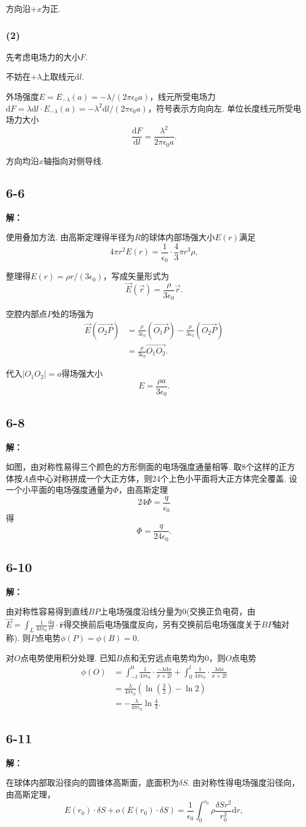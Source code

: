 \documentclass[twocolumn]{ctexart}
\newcommand{\sol}[1]{\subsection*{#1}\noindent\textbf{解：}
	
}
\begin{document}
	方向沿$+x$为正.
	
	\subsubsection*{(2)}
	先考虑电场力的大小$F$.
	
	不妨在$+\lambda$上取线元$\mathrm{d}l$.
	
	外场强度$E=E_{-\lambda}(a)=-\lambda/\left(2\pi\epsilon_0a\right)$，线元所受电场力$\mathrm{d}F=\lambda\mathrm{d}l\cdot E_{-\lambda}(a)=-\lambda^2\mathrm{d}l/\left(2\pi\epsilon_0a\right)$，符号表示方向向左. 单位长度线元所受电场力大小
	$$\frac{\mathrm{d}F}{\mathrm{d}l}=\frac{\lambda^2}{2\pi\epsilon_0a}.$$
	
	方向均沿$x$轴指向对侧导线.
	\sol{6-6}
	使用叠加方法. 由高斯定理得半径为$R$的球体内部场强大小$E(r)$满足
	$$4\pi r^2E(r)=\frac{1}{\epsilon_0}\cdot\frac{4}{3}\pi r^3\rho,$$
	
	整理得$E(r)=\rho r/\left(3\epsilon_0\right)$，写成矢量形式为
	$$\vec{E}(\vec r)=\frac{\rho}{3\epsilon_0}\vec r.$$
	
	空腔内部点$P$处的场强为
	\begin{align*}
		\vec{E}(\vec{{O_2}P})&=\frac{\rho}{3\epsilon_0}\left(\vec{O_1P}\right)-\frac{\rho}{3\epsilon_0}\left(\vec{O_2P}\right)\\
		&=\frac{\rho}{3\epsilon_0}\vec{O_1O_2}.
	\end{align*}
	
	代入$|O_1O_2|=a$得场强大小
	$$E=\frac{\rho a}{3\epsilon_0}.$$
	\sol{6-8}
	
	如图，由对称性易得三个颜色的方形侧面的电场强度通量相等. 取8个这样的正方体按$A$点中心对称拼成一个大正方体，则24个上色小平面将大正方体完全覆盖. 设一个小平面的电场强度通量为$\Phi$，由高斯定理
	$$24\Phi=\frac{q}{\epsilon_0}$$
	得
	$$\Phi=\frac{q}{24\epsilon_0}.$$
	
	\sol{6-10}
	由对称性容易得到直线$BP$上电场强度沿线分量为$0$(交换正负电荷，由$\vec E=\int_L\frac{1}{4\pi\epsilon_0}\frac{\mathrm{d}q}{r^2}\cdot\hat{\mathbf{r}}$得交换前后电场强度反向，另有交换前后电场强度关于$BP$轴对称). 则$P$点电势$\phi(P)=\phi(B)=0$.
	
	对$O$点电势使用积分处理. 已知$B$点和无穷远点电势均为$0$，则$O$点电势
	\begin{align*}
		\phi(O)&=\int_{-l}^{0}\frac{1}{4\pi\epsilon_0}\cdot\frac{-\lambda\mathrm{d}x}{x+2l}+\int_{0}^{l}\frac{1}{4\pi\epsilon_0}\cdot\frac{\lambda\mathrm{d}x}{x+2l}\\
		&=\frac{\lambda}{4\pi\epsilon_0}\left(\ln\left(\frac{3}{2}\right)-\ln2\right)\\
		&=-\frac{\lambda}{4\pi\epsilon_0}\ln\frac{4}{3}.
	\end{align*}
	\sol{6-11}
	在球体内部取沿径向的圆锥体高斯面，底面积为$\delta S$. 由对称性得电场强度沿径向，由高斯定理，
	$$E(r_0)\cdot\delta S+o\left(E(r_0)\cdot\delta S\right)=\frac{1}{\epsilon_0}\int_{0}^{r_0}\rho\frac{\delta Sr^2}{r_0^2}\mathrm{d}r,$$
	
\end{document}
